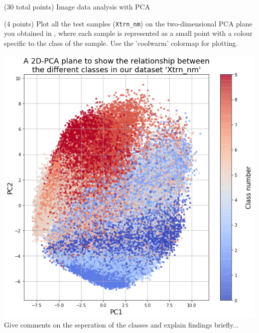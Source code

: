 \documentclass[12pt]{article}
\begin{document}
\begin{question}{(30 total points) Image data analysis with PCA}
\begin{subquestion}
   \end{subquestion}
   \begin{subquestion}{(4 points)
       Plot all the test samples (\texttt{Xtrn\_nm}) on the
       two-dimensional PCA plane you obtained in , where each sample is
       represented as a small point with a colour specific to the class of
       the sample.  Use the 'coolwarm' colormap for plotting.
     } \label{Q1.8}


   

      \begin{answerbox}{52em}
        \includegraphics[width=1\textwidth]{images/q18.png}
        Give comments on the seperation of the classes and explain findings briefly...\\
        
      \end{answerbox}
  


   \end{subquestion}
   

\end{question}
\end{document}
